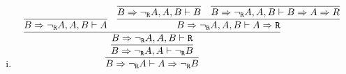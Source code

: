     \begin{enumerate}[(i)]
        \item 
            $$
                \infer{
                    B \Rightarrow \ngr A \vdash A \Rightarrow \ngr B
                }{
                    \infer{
                        B \Rightarrow \ngr A, A \vdash \ngr B
                    }{
                        \infer{
                            B \Rightarrow \ngr A, A, B \vdash \R
                        }{
                            \infer{
                                B \Rightarrow \ngr A, A, B \vdash A
                            }{
                            }&
                            \infer{
                                B \Rightarrow \ngr A, A, B \vdash A\Rightarrow \R
                            }{
                                \infer{
                                    B \Rightarrow \ngr A, A, B \vdash B
                                }{
                                }&
                                \infer{
                                    B \Rightarrow \ngr A, A, B \vdash B \Rightarrow A \Rightarrow R
                                }{
                                }
                            }
                        }
                    }
                }
            $$
            

\end{enumerate}
